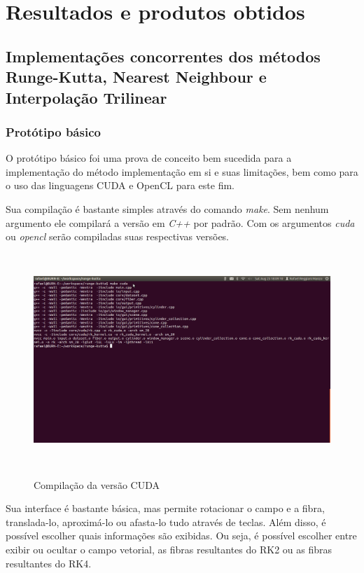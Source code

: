 \chapter{Resultados e produtos obtidos}

\section{Implementações concorrentes dos métodos Runge-Kutta, Nearest Neighbour e Interpolação Trilinear}
  \subsection{Protótipo básico}
  O protótipo básico foi uma prova de conceito bem sucedida para a implementação do método implementação em si e suas limitações, bem como para o uso das linguagens CUDA e OpenCL para este fim.
  
  Sua compilação é bastante simples através do comando \textit{make}. Sem nenhum argumento ele compilará a versão em \textit{C++} por padrão. Com os argumentos \textit{cuda} ou \textit{opencl} serão compiladas suas respectivas versões.
  
  \begin{figure}[!h]
    \begin{center}
      \includegraphics[width=140mm, height=80mm]{images/compilacao.png}
      \label{fig:}
      \caption{Compilação da versão CUDA}
    \end{center}
  \end{figure}
  
  \newpage  
  Sua interface é bastante básica, mas permite rotacionar o campo e a fibra, translada-lo, aproximá-lo ou afasta-lo tudo através de teclas. Além disso, é possível escolher quais informações são exibidas. Ou seja, é possível escolher entre exibir ou ocultar o campo vetorial, as fibras resultantes do RK2 ou as fibras resultantes do RK4.
  
